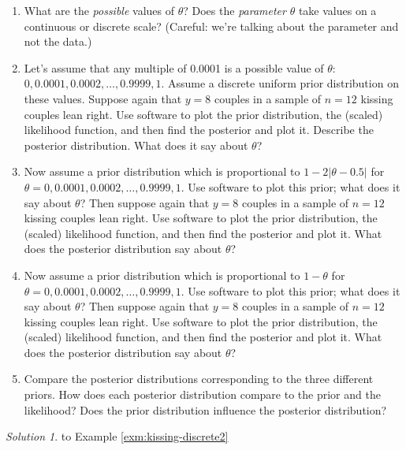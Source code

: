 \documentclass[
]{book}
\providecommand{\tightlist}{%
  \setlength{\itemsep}{0pt}\setlength{\parskip}{0pt}}
\theoremstyle{definition}
\theoremstyle{definition}
\theoremstyle{definition}
\theoremstyle{remark}
\newtheorem*{solution}{Solution}
\begin{document}
\begin{enumerate}
\def\labelenumi{\arabic{enumi}.}
\tightlist
\item
  What are the \emph{possible} values of \(\theta\)?
  Does the \emph{parameter} \(\theta\) take values on a continuous or discrete scale?
  (Careful: we're talking about the parameter and not the data.)
\item
  Let's assume that any multiple of 0.0001 is a possible value of \(\theta\): \(0, 0.0001, 0.0002, \ldots, 0.9999, 1\).
  Assume a discrete uniform prior distribution on these values.
  Suppose again that \(y=8\) couples in a sample of \(n=12\) kissing couples lean right.
  Use software to plot the prior distribution, the (scaled) likelihood function, and then find the posterior and plot it. Describe the posterior distribution.
  What does it say about \(\theta\)?
\item
  Now assume a prior distribution which is proportional to \(1-2|\theta-0.5|\) for \(\theta = 0, 0.0001, 0.0002, \ldots, 0.9999, 1\).
  Use software to plot this prior; what does it say about \(\theta\)?
  Then suppose again that \(y=8\) couples in a sample of \(n=12\) kissing couples lean right.
  Use software to plot the prior distribution, the (scaled) likelihood function, and then find the posterior and plot it.
  What does the posterior distribution say about \(\theta\)?
\item
  Now assume a prior distribution which is proportional to \(1-\theta\) for \(\theta = 0, 0.0001, 0.0002, \ldots, 0.9999, 1\).
  Use software to plot this prior; what does it say about \(\theta\)?
  Then suppose again that \(y=8\) couples in a sample of \(n=12\) kissing couples lean right.
  Use software to plot the prior distribution, the (scaled) likelihood function, and then find the posterior and plot it.
  What does the posterior distribution say about \(\theta\)?
\item
  Compare the posterior distributions corresponding to the three different priors. How does each posterior distribution compare to the prior and the likelihood? Does the prior distribution influence the posterior distribution?
\end{enumerate}

\begin{solution}
{}to Example \ref{exm:kissing-discrete2}
\end{solution}
\end{document}

